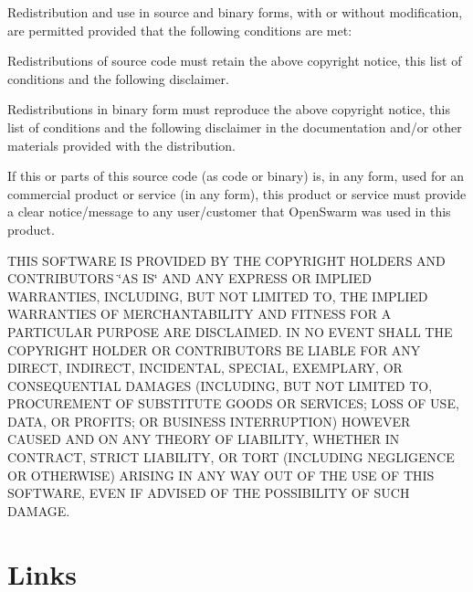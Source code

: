 Redistribution and use in source and binary forms, with or without modification, are permitted provided that the following conditions are met\+:


\begin{DoxyEnumerate}
\item Redistributions of source code must retain the above copyright notice, this list of conditions and the following disclaimer.
\item Redistributions in binary form must reproduce the above copyright notice, this list of conditions and the following disclaimer in the documentation and/or other materials provided with the distribution.
\item If this or parts of this source code (as code or binary) is, in any form, used for an commercial product or service (in any form), this product or service must provide a clear notice/message to any user/customer that Open\+Swarm was used in this product.
\end{DoxyEnumerate}

T\+H\+I\+S S\+O\+F\+T\+W\+A\+R\+E I\+S P\+R\+O\+V\+I\+D\+E\+D B\+Y T\+H\+E C\+O\+P\+Y\+R\+I\+G\+H\+T H\+O\+L\+D\+E\+R\+S A\+N\+D C\+O\+N\+T\+R\+I\+B\+U\+T\+O\+R\+S \char`\"{}\+A\+S I\+S\char`\"{} A\+N\+D A\+N\+Y E\+X\+P\+R\+E\+S\+S O\+R I\+M\+P\+L\+I\+E\+D W\+A\+R\+R\+A\+N\+T\+I\+E\+S, I\+N\+C\+L\+U\+D\+I\+N\+G, B\+U\+T N\+O\+T L\+I\+M\+I\+T\+E\+D T\+O, T\+H\+E I\+M\+P\+L\+I\+E\+D W\+A\+R\+R\+A\+N\+T\+I\+E\+S O\+F M\+E\+R\+C\+H\+A\+N\+T\+A\+B\+I\+L\+I\+T\+Y A\+N\+D F\+I\+T\+N\+E\+S\+S F\+O\+R A P\+A\+R\+T\+I\+C\+U\+L\+A\+R P\+U\+R\+P\+O\+S\+E A\+R\+E D\+I\+S\+C\+L\+A\+I\+M\+E\+D. I\+N N\+O E\+V\+E\+N\+T S\+H\+A\+L\+L T\+H\+E C\+O\+P\+Y\+R\+I\+G\+H\+T H\+O\+L\+D\+E\+R O\+R C\+O\+N\+T\+R\+I\+B\+U\+T\+O\+R\+S B\+E L\+I\+A\+B\+L\+E F\+O\+R A\+N\+Y D\+I\+R\+E\+C\+T, I\+N\+D\+I\+R\+E\+C\+T, I\+N\+C\+I\+D\+E\+N\+T\+A\+L, S\+P\+E\+C\+I\+A\+L, E\+X\+E\+M\+P\+L\+A\+R\+Y, O\+R C\+O\+N\+S\+E\+Q\+U\+E\+N\+T\+I\+A\+L D\+A\+M\+A\+G\+E\+S (I\+N\+C\+L\+U\+D\+I\+N\+G, B\+U\+T N\+O\+T L\+I\+M\+I\+T\+E\+D T\+O, P\+R\+O\+C\+U\+R\+E\+M\+E\+N\+T O\+F S\+U\+B\+S\+T\+I\+T\+U\+T\+E G\+O\+O\+D\+S O\+R S\+E\+R\+V\+I\+C\+E\+S; L\+O\+S\+S O\+F U\+S\+E, D\+A\+T\+A, O\+R P\+R\+O\+F\+I\+T\+S; O\+R B\+U\+S\+I\+N\+E\+S\+S I\+N\+T\+E\+R\+R\+U\+P\+T\+I\+O\+N) H\+O\+W\+E\+V\+E\+R C\+A\+U\+S\+E\+D A\+N\+D O\+N A\+N\+Y T\+H\+E\+O\+R\+Y O\+F L\+I\+A\+B\+I\+L\+I\+T\+Y, W\+H\+E\+T\+H\+E\+R I\+N C\+O\+N\+T\+R\+A\+C\+T, S\+T\+R\+I\+C\+T L\+I\+A\+B\+I\+L\+I\+T\+Y, O\+R T\+O\+R\+T (I\+N\+C\+L\+U\+D\+I\+N\+G N\+E\+G\+L\+I\+G\+E\+N\+C\+E O\+R O\+T\+H\+E\+R\+W\+I\+S\+E) A\+R\+I\+S\+I\+N\+G I\+N A\+N\+Y W\+A\+Y O\+U\+T O\+F T\+H\+E U\+S\+E O\+F T\+H\+I\+S S\+O\+F\+T\+W\+A\+R\+E, E\+V\+E\+N I\+F A\+D\+V\+I\+S\+E\+D O\+F T\+H\+E P\+O\+S\+S\+I\+B\+I\+L\+I\+T\+Y O\+F S\+U\+C\+H D\+A\+M\+A\+G\+E.\hypertarget{index_link_sec}{}\section{Links}\label{index_link_sec}

